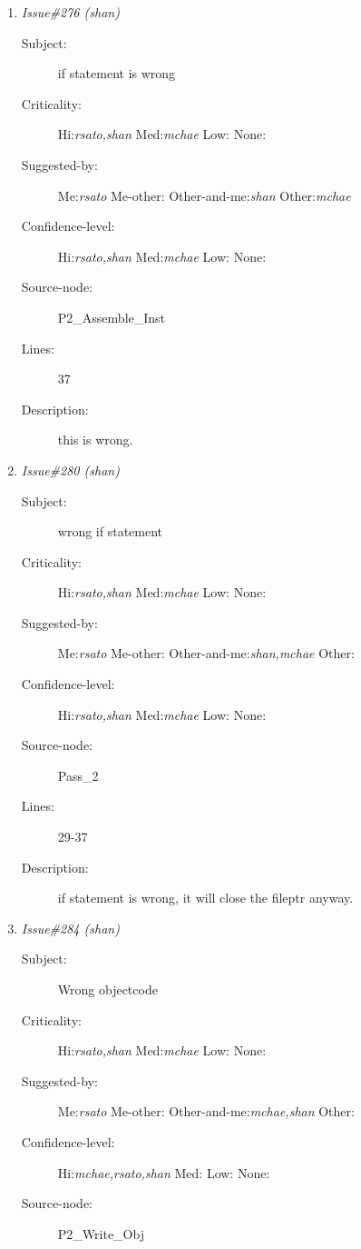 \begin{enumerate}
\begin{description}
\item [Lines:] 35

\item [Description:] the value of i is not known, should be 1
\end{description}
\item {\it Issue\#276 (shan)}
\begin{description}
\item [Subject:] if statement is wrong
\item [Criticality:] Hi:{\it rsato,shan} Med:{\it mchae} Low:{\it } None:{\it }
\item [Suggested-by:] Me:{\it rsato} Me-other:{\it } Other-and-me:{\it shan} Other:{\it mchae}
\item [Confidence-level:] Hi:{\it rsato,shan} Med:{\it mchae} Low:{\it } None:{\it }
\item [Source-node:] P2\_Assemble\_Inst

\item [Lines:] 37

\item [Description:] this is wrong.
\end{description}
\item {\it Issue\#280 (shan)}
\begin{description}
\item [Subject:] wrong if statement
\item [Criticality:] Hi:{\it rsato,shan} Med:{\it mchae} Low:{\it } None:{\it }
\item [Suggested-by:] Me:{\it rsato} Me-other:{\it } Other-and-me:{\it shan,mchae} Other:{\it }
\item [Confidence-level:] Hi:{\it rsato,shan} Med:{\it mchae} Low:{\it } None:{\it }
\item [Source-node:] Pass\_2

\item [Lines:] 29-37

\item [Description:] if statement is wrong, it will close the fileptr anyway.
\end{description}
\item {\it Issue\#284 (shan)}
\begin{description}
\item [Subject:] Wrong objectcode
\item [Criticality:] Hi:{\it rsato,shan} Med:{\it mchae} Low:{\it } None:{\it }
\item [Suggested-by:] Me:{\it rsato} Me-other:{\it } Other-and-me:{\it mchae,shan} Other:{\it }
\item [Confidence-level:] Hi:{\it mchae,rsato,shan} Med:{\it } Low:{\it } None:{\it }
\item [Source-node:] P2\_Write\_Obj


\end{description}
\end{enumerate}
